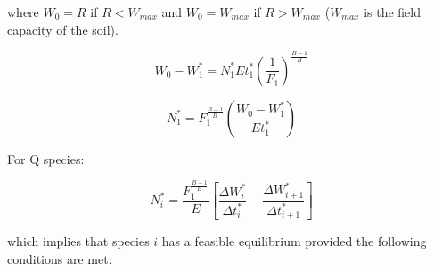 \documentclass[11pt]{article}
\begin{document}
where \(W_0 = R\) if \(R < W_{max}\) and \(W_0 = W_{max}\) if \(R > W_{max}\) (\(W_{max}\) is the field capacity of the soil).

\begin{equation}
W_0 - W_1^* = N_1^* E t_1^* \left(\frac{1}{F_1}\right)^{\frac{B-1}{B}}
\end{equation}

\begin{equation}
 N_1^* = F_1^{\frac{B-1}{B}}\left(\frac{W_0 - W_1^*}{E t_1^*}\right)
\end{equation}

For Q species:

\begin{equation}
N_i^* = \frac{F_1^{\frac{B-1}{B}}}{E}\left[\frac{\Delta W_i^*}{\Delta t_i^*} - \frac{\Delta W_{i+1}^*}{\Delta t_{i+1}^*} \right]
\end{equation}

which implies that species \(i\) has a feasible equilibrium provided the following conditions are met:
\end{document}
